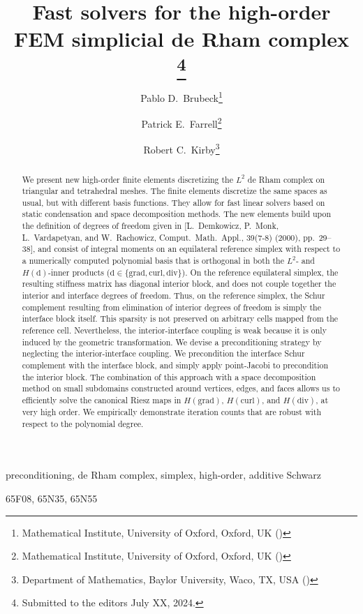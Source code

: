 \documentclass[review,onefignum,onetabnum,a4paper]{siamart190516}
\title{
   Fast solvers for the high-order FEM simplicial de Rham complex
\thanks{Submitted to the editors July XX, 2024.
      \funding{
         PDB and PEF were supported by EPSRC grant EP/W026260/1.
      }
   }
}
\author{Pablo D.\ Brubeck\thanks{
Mathematical Institute,
University of Oxford,
Oxford, UK (\email{brubeckmarti@maths.ox.ac.uk})
}
\and Patrick E.\ Farrell\thanks{
Mathematical Institute,
University of Oxford,
Oxford, UK (\email{patrick.farrell@maths.ox.ac.uk})
}
\and Robert C.\ Kirby\thanks{
Department of Mathematics,
Baylor University,
Waco, TX, USA (\email{robert\_kirby@baylor.edu})
}
}
\begin{document}
\maketitle

\begin{abstract}
We present new high-order finite elements discretizing the $L^2$ de Rham
complex on triangular and tetrahedral meshes. The finite elements discretize
the same spaces as usual, but with different basis functions. They allow for
fast linear solvers based on static condensation and space decomposition
methods. The new elements build upon the definition of degrees of freedom
given in [L.~Demkowicz, P.~Monk, L.~Vardapetyan, and W.~Rachowicz,
Comput.~Math.~Appl.,
39(7-8) (2000), pp.~29--38], and consist of integral moments
on an equilateral reference simplex with respect to a numerically computed
polynomial basis that is orthogonal in both the $L^2$- and
$H(\mathrm{d})$-inner products ($\mathrm{d} \in \{\mathrm{grad},
\mathrm{curl}, \mathrm{div}\}$). 
On the reference equilateral simplex, the
resulting stiffness matrix has diagonal interior block, and does not couple
together the interior and interface degrees of freedom. Thus, on the
reference simplex, the Schur complement resulting from elimination of
interior degrees of freedom is simply the interface block itself. This
sparsity is not preserved on arbitrary cells mapped from the reference cell.
Nevertheless, the interior-interface coupling is weak because it is only
induced by the geometric transformation. We devise a preconditioning
strategy by neglecting the interior-interface coupling. We precondition the
interface Schur complement with the interface block, and simply apply
point-Jacobi to precondition the interior block. The combination of this
approach with a space decomposition method on small subdomains constructed
around vertices, edges, and faces allows us to efficiently solve the
canonical Riesz maps in $H(\mathrm{grad})$, $H(\mathrm{curl})$, and
$H(\mathrm{div})$, at very high order. We empirically demonstrate iteration
counts that are robust with respect to the polynomial degree. 
\end{abstract}

\begin{keywords}
   preconditioning, de Rham complex, simplex, high-order, additive Schwarz
\end{keywords}

\begin{AMS}
   65F08, 65N35, 65N55
\end{AMS}
\end{document}

